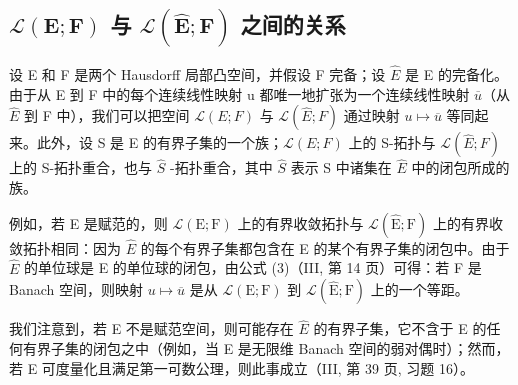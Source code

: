 \subsection{\texorpdfstring{\(\mathcal{L}(\mathbf{E};\mathbf{F})\) 与 \(\mathcal{L}(\hat{\mathbf{E}};\mathbf{F})\) 之间的关系}{\textbackslash mathcal\{L\}(\textbackslash mathbf\{E\};\textbackslash mathbf\{F\}) 与 \textbackslash mathcal\{L\}(\textbackslash hat\{\textbackslash mathbf\{E\}\};\textbackslash mathbf\{F\}) 之间的关系}}

设 E 和 F 是两个 Hausdorff 局部凸空间，并假设 F 完备；设 \(\hat{E}\) 是 E 的完备化。由于从 E 到 F 中的每个连续线性映射 u 都唯一地扩张为一个连续线性映射 \(\overline{u}\)（从 \(\hat{E}\) 到 F 中），我们可以把空间 \(\mathcal{L}(E;F)\) 与 \(\mathcal{L}(\hat{E};F)\) 通过映射 \(u\mapsto\overline{u}\) 等同起来。此外，设 S 是 E 的有界子集的一个族；\(\mathcal{L}(E;F)\) 上的 S-拓扑与 \(\mathcal{L}(\hat{E};F)\) 上的 S-拓扑重合，也与 \(\hat{S}\) -拓扑重合，其中 \(\hat{S}\) 表示 S 中诸集在 \(\hat{E}\) 中的闭包所成的族。

例如，若 E 是赋范的，则 \(\mathcal{L}(\mathrm{E};\mathrm{F})\) 上的有界收敛拓扑与 \(\mathcal{L}(\hat{\mathrm{E}};\mathrm{F})\) 上的有界收敛拓扑相同：因为 \(\hat{E}\) 的每个有界子集都包含在 E 的某个有界子集的闭包中。由于 \(\hat{E}\) 的单位球是 E 的单位球的闭包，由公式 (3)（III, 第 14 页）可得：若 F 是 Banach 空间，则映射 \(u\mapsto\overline{u}\) 是从 \(\mathcal{L}(\mathrm{E};\mathrm{F})\) 到 \(\mathcal{L}(\hat{\mathrm{E}};\mathrm{F})\) 上的一个等距。

我们注意到，若 E 不是赋范空间，则可能存在 \(\hat{E}\) 的有界子集，它不含于 E 的任何有界子集的闭包之中（例如，当 E 是无限维 Banach 空间的弱对偶时）；然而，若 E 可度量化且满足第一可数公理，则此事成立（III, 第 39 页, 习题 16）。

